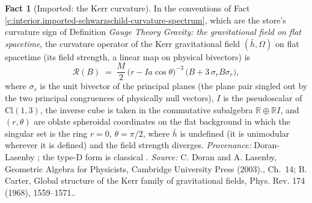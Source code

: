 \documentclass[11pt]{article}
\theoremstyle{definition}
\newtheorem{fact}[theorem]{Fact}
\theoremstyle{plain}
\newcommand{\changedmark}[2]{\marginpar{\raggedright\scriptsize\color{#1}#2}}
\providecommand{\Cl}{}\renewcommand{\Cl}{\mathrm{Cl}}
\providecommand{\R}{}\renewcommand{\R}{\mathbb{R}}
\providecommand{\hb}{}\renewcommand{\hb}{\bar{h}}
\begin{document}
\begin{fact}[Imported: the Kerr curvature]\label{c:interior.imported-kerr-curvature}
\changedmark{gray}{reworded}
In the conventions of Fact \ref{c:interior.imported-schwarzschild-curvature-spectrum}, which are the store's curvature sign of Definition \emph{Gauge Theory Gravity: the gravitational field on flat spacetime}, the curvature operator of the Kerr gravitational field $(\hb, \Omega)$ on flat spacetime (its field strength, a linear map on physical bivectors) is
\[
\mathcal{R}(B) \;=\; \frac{M}{2}\,\bigl(r - I a\cos\theta\bigr)^{-3}\,\bigl(B + 3\,\sigma_r B\sigma_r\bigr),
\]
where $\sigma_r$ is the unit bivector of the principal planes (the plane pair singled out by the two principal congruences of physically null vectors), $I$ is the pseudoscalar of $\Cl(1,3)$, the inverse cube is taken in the commutative subalgebra $\R \oplus \R I$, and $(r,\theta)$ are oblate spheroidal coordinates on the flat background in which the singular set is the ring $r = 0$, $\theta = \pi/2$, where $\hb$ is undefined (it is unimodular wherever it is defined) and the field strength diverges. \emph{Provenance:} Doran-Lasenby \cite[Ch.~14]{DoranLasenby2003}; the type-D form is classical \cite{Carter1968}.
\emph{Source:} C. Doran and A. Lasenby, Geometric Algebra for Physicists, Cambridge University Press (2003)., Ch.~14; B. Carter, Global structure of the Kerr family of gravitational fields, Phys. Rev. 174 (1968), 1559--1571..
\end{fact}
\end{document}
